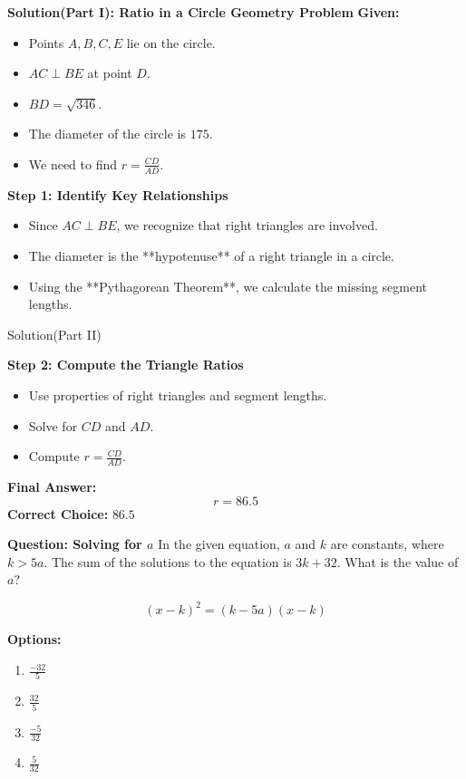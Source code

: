 \documentclass{beamer}
\begin{document}
\begin{frame}{\textbf{Solution(Part I): Ratio in a Circle Geometry Problem}}
    \textbf{Given:}
    \begin{itemize}
        \item Points \( A, B, C, E \) lie on the circle.
        \item \( AC \perp BE \) at point \( D \).
        \item \( BD = \sqrt{346} \).
        \item The diameter of the circle is \( 175 \).
        \item We need to find \( r = \frac{CD}{AD} \).
    \end{itemize}

    \vspace{0.4cm}
    \textbf{Step 1: Identify Key Relationships}
    \begin{itemize}
        \item Since \( AC \perp BE \), we recognize that right triangles are involved.
        \item The diameter is the **hypotenuse** of a right triangle in a circle.
        \item Using the **Pythagorean Theorem**, we calculate the missing segment lengths.
    \end{itemize}

\end{frame}

\begin{frame}{Solution(Part II)}

    \vspace{0.4cm}
    \textbf{Step 2: Compute the Triangle Ratios}
    \begin{itemize}
        \item Use properties of right triangles and segment lengths.
        \item Solve for \( CD \) and \( AD \).
        \item Compute \( r = \frac{CD}{AD} \).
    \end{itemize}

    \vspace{0.4cm}
    \textbf{Final Answer:} 
    \[
    r = 86.5
    \]
    \textbf{Correct Choice:} \textcolor{novelPurple}{\( 86.5 \)}
    
\end{frame}


\begin{frame}{\textbf{Question: Solving for \( a \)}}
    In the given equation, \(a\) and \(k\) are constants, where \(k > 5a\). The sum of the solutions to the equation is \(3k + 32\). What is the value of \(a\)?

    \[
    (x - k)^2 = (k - 5a)(x - k)
    \]

    \textbf{Options:}
    \begin{enumerate}
        \item[A] \(\frac{-32}{5}\)
        \item[B] \(\frac{32}{5}\)
        \item[C] \(\frac{-5}{32}\)
        \item[D] \(\frac{5}{32}\)
    \end{enumerate}
\end{frame}
\end{document}
